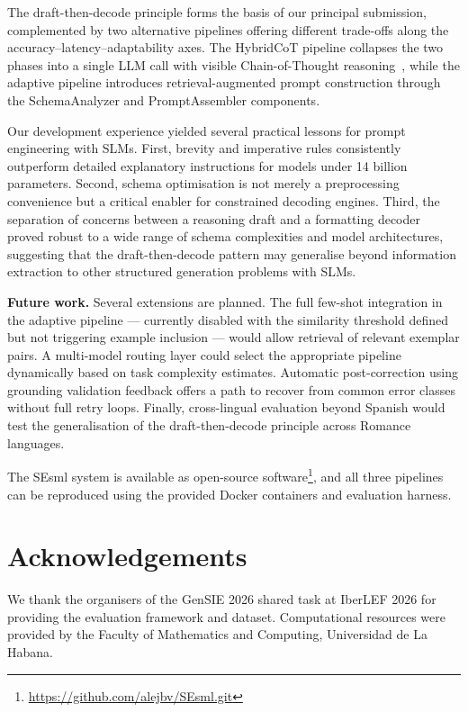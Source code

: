 \documentclass[onecolumn]{ceurart}
\begin{document}
The draft-then-decode principle forms the basis of our principal submission,
complemented by two alternative pipelines offering different trade-offs along
the accuracy--latency--adaptability axes. The HybridCoT pipeline collapses the
two phases into a single LLM call with visible Chain-of-Thought
reasoning~\citep{wei2022chain}, while the adaptive pipeline introduces
retrieval-augmented prompt construction through the SchemaAnalyzer and
PromptAssembler components.

Our development experience yielded several practical lessons for prompt
engineering with SLMs. First, brevity and imperative rules consistently
outperform detailed explanatory instructions for models under 14 billion
parameters. Second, schema optimisation is not merely a preprocessing
convenience but a critical enabler for constrained decoding engines. Third, the
separation of concerns between a reasoning draft and a formatting decoder proved
robust to a wide range of schema complexities and model architectures,
suggesting that the draft-then-decode pattern may generalise beyond information
extraction to other structured generation problems with SLMs.

\textbf{Future work.} Several extensions are planned. The full few-shot
integration in the adaptive pipeline --- currently disabled with the similarity
threshold defined but not triggering example inclusion --- would allow retrieval
of relevant exemplar pairs. A multi-model routing layer could select the
appropriate pipeline dynamically based on task complexity estimates. Automatic
post-correction using grounding validation feedback offers a path to recover
from common error classes without full retry loops. Finally, cross-lingual
evaluation beyond Spanish would test the generalisation of the draft-then-decode
principle across Romance languages.

The SEsml system is available as open-source
software\footnote{\url{https://github.com/alejbv/SEsml.git}}, and all three
pipelines can be reproduced using the provided Docker containers and evaluation
harness.


\section*{Acknowledgements}

We thank the organisers of the GenSIE 2026 shared task at IberLEF 2026 for
providing the evaluation framework and dataset. Computational resources were
provided by the Faculty of Mathematics and Computing, Universidad de La Habana.



\end{document}
